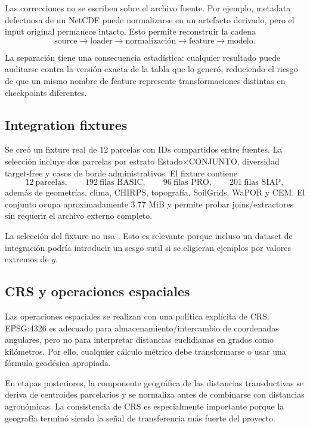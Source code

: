 Las correcciones no se escriben sobre el archivo fuente. Por ejemplo, metadata defectuosa de
un NetCDF puede normalizarse en un artefacto derivado, pero el input original permanece
intacto. Esto permite reconstruir la cadena
\[
\text{source}
\longrightarrow
\text{loader}
\longrightarrow
\text{normalización}
\longrightarrow
\text{feature}
\longrightarrow
\text{modelo}.
\]

La separación tiene una consecuencia estadística: cualquier resultado puede auditarse contra
la versión exacta de la tabla que lo generó, reduciendo el riesgo de que un mismo nombre de
feature represente transformaciones distintas en checkpoints diferentes.

\subsection{Integration fixtures}

Se creó un fixture real de 12 parcelas con IDs compartidos entre fuentes. La selección incluye
dos parcelas por estrato Estado$\times$CONJUNTO, diversidad target-free y casos de borde
administrativos. El fixture contiene
\[
12\ \text{parcelas},\qquad
192\ \text{filas BASIC},\qquad
96\ \text{filas PRO},\qquad
201\ \text{filas SIAP},
\]
además de geometrías, clima, CHIRPS, topografía, SoilGrids, WaPOR y CEM. El conjunto ocupa
aproximadamente 3.77 MiB y permite probar joins/extractores sin requerir el archivo externo
completo.

La selección del fixture no usa . Esto es relevante porque incluso
un dataset de integración podría introducir un sesgo sutil si se eligieran ejemplos por
valores extremos de $y$.

\subsection{CRS y operaciones espaciales}

Las operaciones espaciales se realizan con una política explícita de CRS. EPSG:4326 es
adecuado para almacenamiento/intercambio de coordenadas angulares, pero no para interpretar
distancias euclidianas en grados como kilómetros. Por ello, cualquier cálculo métrico debe
transformarse o usar una fórmula geodésica apropiada.

En etapas posteriores, la componente geográfica de las distancias transductivas se deriva de
centroides parcelarios y se normaliza antes de combinarse con distancias agronómicas. La
consistencia de CRS es especialmente importante porque la geografía terminó siendo la señal
de transferencia más fuerte del proyecto.

